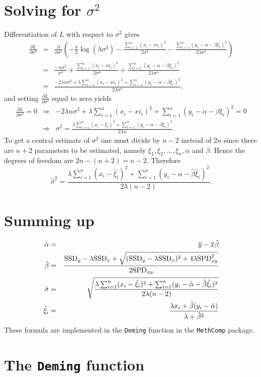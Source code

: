 \documentclass[a4paper,twoside,12pt]{article}
\providecommand{\SSD}{\text{\rm SSD}}
\providecommand{\SPD}{\text{\rm SPD}}
\begin{document}

\section{Solving for $\sigma^2$}
Differentiation of $L$ with respect to $\sigma^2$ gives
\begin{eqnarray*}
\frac{\partial L}{\partial\sigma^2}
&=&
\frac{\partial}{\partial\sigma^2}\left(
-\frac{n}{2}\log(\lambda\sigma^4)-\frac{\sum_{i=1}^n(x_i-xi_i)^2}{2\sigma^2}-\frac{\sum_{i=1}^n(y_i-\alpha-\beta\xi_i)^2}{2\lambda\sigma^2}
\right)\\[1em]
&=&
\frac{-n\sigma^2}{\sigma^4}+\frac{\sum_{i=1}^n(x_i-xi_i)^2}{2\sigma^4}+\frac{\sum_{i=1}^n(y_i-\alpha-\beta\xi_i)^2}{2\lambda\sigma^4}\\[1em]
&=&
\frac{-2\lambda n\sigma^2+\lambda\sum_{i=1}^n(x_i-xi_i)^2+\sum_{i=1}^n(y_i-\alpha-\beta\xi_i)^2}{2\lambda\sigma^4},
\end{eqnarray*}
and setting $\frac{\partial L}{\partial \sigma^2}$ equal to zero yields
\begin{eqnarray*}
\frac{\partial L}{\partial \sigma^2}=0
&\Rightarrow&
-2\lambda n\sigma^2+\lambda\sum_{i=1}^n(x_i-xi_i)^2+\sum_{i=1}^n(y_i-\alpha-\beta\xi_i)^2=0\\[1em]
&\Rightarrow&
\sigma^2=\frac{\lambda\sum_{i=1}^n(x_i-\xi_i)^2+\sum_{i=1}^n(y_i-\alpha-\beta\xi_i)^2}{2\lambda n}.
\end{eqnarray*}
To get a central estimate of $\sigma^2$ one must divide by $n-2$
instead of $2n$ since there are $n+2$ parameters to be estimated,
namely $\xi_1,\xi_2,\ldots,\xi_n,\alpha$ and $\beta$. Hence the
degrees of freedom are $2n-(n+2)=n-2$. Therefore
$$
\hat{\sigma}^2=\frac{\lambda\sum_{i=1}^n(x_i-\hat{\xi}_i)^2+\sum_{i=1}^n(y_i-\hat{\alpha}-\hat{\beta}\hat{\xi}_i)^2}{2\lambda (n-2)}.
$$
\section{Summing up}
\begin{eqnarray*}
\hat{\alpha} &=& \overline{y}-\overline{x}\hat{\beta}\\
\hat{\beta}    &=& \frac{\SSD_y-\lambda\SSD_x+\sqrt{(\SSD_y-\lambda\SSD_x)^2+4\lambda\SPD_{xy}^2}}{2\SPD_{xy}}\\
\hat{\sigma}   &=& \sqrt{\frac{\lambda\sum_{i=1}^n(x_i-\hat{\xi}_i)^2+\sum_{i=1}^n(y_i-\hat{\alpha}-\hat{\beta}\hat{\xi}_i)^2}{2\lambda (n-2)}}\\
\hat{\xi}_i    &=& \frac{\lambda x_i+\hat{\beta}(y_i-\hat{\alpha})}{\lambda+\hat{\beta}^2}
\end{eqnarray*}
These formula are implemented in the \texttt{Deming} function in the \texttt{MethComp} package.
\clearpage
\section{The \texttt{Deming} function}
 \scriptsize
 \renewcommand{\baselinestretch}{0.8}
 
 \renewcommand{\baselinestretch}{1.0}
 \normalsize
\end{document}
